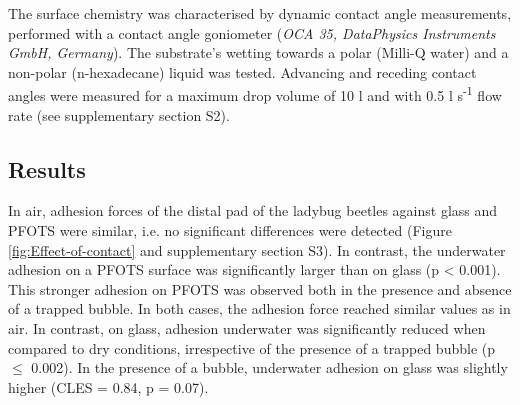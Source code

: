 \documentclass[vruler,JEB]{COB}%
\begin{document}
The surface chemistry was characterised by dynamic contact angle
measurements, performed with a contact angle goniometer (\emph{OCA 35, DataPhysics Instruments GmbH, Germany}).
The substrate's wetting towards a polar (Milli-Q water) and a non-polar (n-hexadecane) liquid was tested. Advancing
and receding contact angles were measured for a maximum drop volume
of 10 \textmu l and with 0.5 \textmu l s\protect\textsuperscript{-1} flow rate (see supplementary section S2).

\subsection{Results}


In air, adhesion forces of the distal pad of the ladybug beetles against
glass and PFOTS were similar, i.e. no significant differences were
detected (Figure \ref{fig:Effect-of-contact} and supplementary section S3).
In contrast, the underwater adhesion on a PFOTS surface was significantly
larger than on glass (p < 0.001). This stronger adhesion on PFOTS
was observed both in the presence and absence of a trapped bubble.
In both cases, the adhesion force reached similar values as in air. In contrast,
on glass, adhesion underwater was significantly reduced when compared
to dry conditions, irrespective of the presence of a trapped bubble
(p $\leq$ 0.002). In the presence of a bubble, underwater adhesion on glass was slightly higher (CLES = 0.84, p = 0.07).
\end{document}
